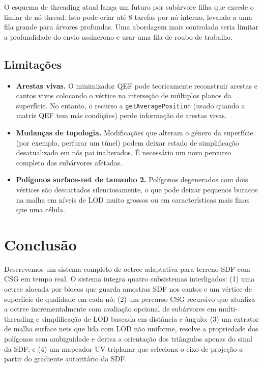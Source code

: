 \documentclass[10pt,a4paper]{article}
\begin{document}
O esquema de threading atual lança um futuro por subárvore filha que
excede o limiar de nó thread. Isto pode criar até 8 tarefas por nó
interno, levando a uma fila grande para árvores profundas. Uma
abordagem mais controlada seria limitar a profundidade do envio
assíncrono e usar uma fila de roubo de trabalho.

\subsection{Limitações}

\begin{itemize}
  \item \textbf{Arestas vivas.} O minimizador QEF pode teoricamente
    reconstruir arestas e cantos vivos colocando o vértice na
    interseção de múltiplos planos da superfície. No entanto, o
    recurso a \lstinline{getAveragePosition} (usado quando a matriz
    QEF tem más condições) perde informação de arestas vivas.
  \item \textbf{Mudanças de topologia.} Modificações que alteram o
    género da superfície (por exemplo, perfurar um túnel) podem
    deixar estado de simplificação desatualizado em nós pai
    inalterados. É necessário um novo percurso completo das
    subárvores afetadas.
  \item \textbf{Polígonos surface-net de tamanho 2.} Polígonos
    degenerados com dois vértices são descartados silenciosamente, o
    que pode deixar pequenos buracos na malha em níveis de LOD muito
    grossos ou em características mais finas que uma célula.
\end{itemize}

\section{Conclusão}
\label{sec:conclusion}

Descrevemos um sistema completo de octree adaptativa para terreno SDF
com CSG em tempo real. O sistema integra quatro subsistemas
interligados: (1) uma octree alocada por blocos que guarda amostras
SDF nos cantos e um vértice de superfície de qualidade em cada nó;
(2) um percurso CSG recursivo que atualiza a octree incrementalmente
com avaliação opcional de subárvores em multi-threading e
simplificação de LOD baseada em distância e ângulo; (3) um extrator
de malha surface nets que lida com LOD não uniforme, resolve a
propriedade dos polígonos sem ambiguidade e deriva a orientação dos
triângulos apenas do sinal da SDF; e (4) um mapeador UV triplanar
que seleciona o eixo de projeção a partir do gradiente autoritário
da SDF.
\end{document}
